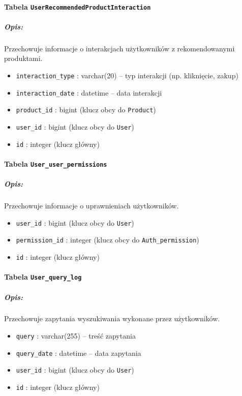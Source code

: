 \documentclass[12pt,a4paper,oneside]{article}
\theoremstyle{definition}
\numberwithin{equation}{section}
\begin{document}
\paragraph{Tabela \texttt{UserRecommendedProductInteraction}}
\subparagraph{Opis:} Przechowuje informacje o interakcjach użytkowników z rekomendowanymi produktami.
\begin{itemize}
    \item \texttt{interaction\string_type} : varchar(20) – typ interakcji (np. kliknięcie, zakup)
    \item \texttt{interaction\string_date} : datetime – data interakcji
    \item \texttt{product\string_id} : bigint (klucz obcy do \texttt{Product})
    \item \texttt{user\string_id} : bigint (klucz obcy do \texttt{User})
    \item \texttt{id} : integer (klucz główny)
\end{itemize}

\paragraph{Tabela \texttt{User\string_user\string_permissions}}
\subparagraph{Opis:} Przechowuje informacje o uprawnieniach użytkowników.
\begin{itemize}
    \item \texttt{user\string_id} : bigint (klucz obcy do \texttt{User})
    \item \texttt{permission\string_id} : integer (klucz obcy do \texttt{Auth\string_permission})
    \item \texttt{id} : integer (klucz główny)
\end{itemize}

\paragraph{Tabela \texttt{User\string_query\string_log}}
\subparagraph{Opis:} Przechowuje zapytania wyszukiwania wykonane przez użytkowników.
\begin{itemize}
    \item \texttt{query} : varchar(255) – treść zapytania
    \item \texttt{query\string_date} : datetime – data zapytania
    \item \texttt{user\string_id} : bigint (klucz obcy do \texttt{User})
    \item \texttt{id} : integer (klucz główny)
\end{itemize}
\end{document}
